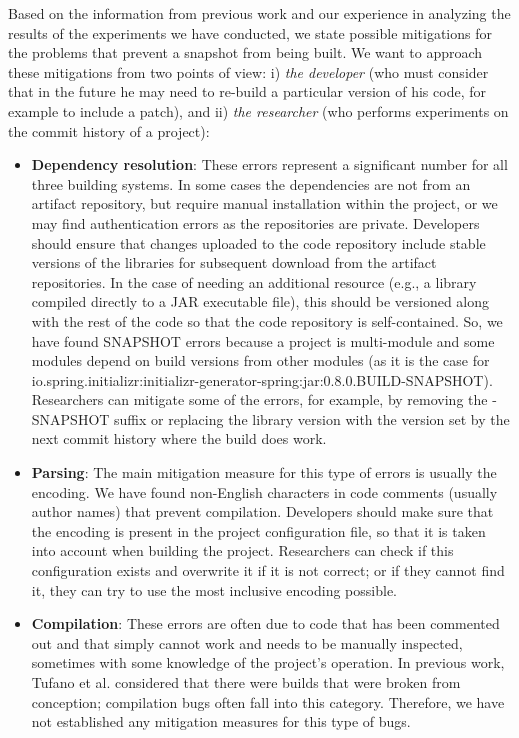 Based on the information from previous work and our experience in analyzing the results of the experiments we have conducted, we state possible mitigations for the problems that prevent a snapshot from being built. We want to approach these mitigations from two points of view: i) \textit{the developer} (who must consider that in the future he may need to re-build a particular version of his code, for example to include a patch), and ii) \textit{the researcher} (who performs experiments on the commit history of a project):

\begin{itemize}
    \item \textbf{Dependency resolution}: These errors represent a significant number for all three building systems. In some cases the dependencies are not from an artifact repository, but require manual installation within the project, or we may find authentication errors as the repositories are private. Developers should ensure that changes uploaded to the code repository include stable versions of the libraries for subsequent download from the artifact repositories. In the case of needing an additional resource (e.g., a library compiled directly to a JAR executable file), this should be versioned along with the rest of the code so that the code repository is self-contained. So, we have found SNAPSHOT errors because a project is multi-module and some modules depend on build versions from other modules (as it is the case for io.spring.initializr:initializr-generator-spring:jar:0.8.0.BUILD-SNAPSHOT). Researchers can mitigate some of the errors, for example, by removing the -SNAPSHOT suffix or replacing the library version with the version set by the next commit history where the build does work.
    \item \textbf{Parsing}: The main mitigation measure for this type of errors is usually the encoding. We have found non-English characters in code comments (usually author names) that prevent compilation. Developers should make sure that the encoding is present in the project configuration file, so that it is taken into account when building the project. Researchers can check if this configuration exists and overwrite it if it is not correct; or if they cannot find it, they can try to use the most inclusive encoding possible.
    \item \textbf{Compilation}: These errors are often due to code that has been commented out and that simply cannot work and needs to be manually inspected, sometimes with some knowledge of the project's operation. In previous work, Tufano et al. considered that there were builds that were broken from conception; compilation bugs often fall into this category. Therefore, we have not established any mitigation measures for this type of bugs.

\end{itemize}

